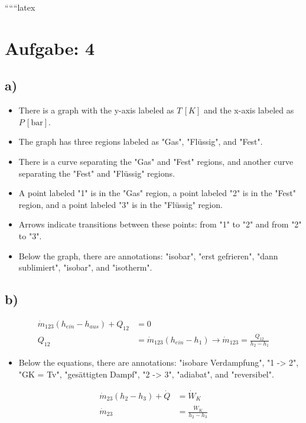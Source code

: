 
``````latex


\section*{Aufgabe: 4}

\subsection*{a)}

\begin{itemize}
    \item There is a graph with the y-axis labeled as \( T \, [K] \) and the x-axis labeled as \( P \, [\text{bar}] \).
    \item The graph has three regions labeled as "Gas", "Flüssig", and "Fest".
    \item There is a curve separating the "Gas" and "Fest" regions, and another curve separating the "Fest" and "Flüssig" regions.
    \item A point labeled "1" is in the "Gas" region, a point labeled "2" is in the "Fest" region, and a point labeled "3" is in the "Flüssig" region.
    \item Arrows indicate transitions between these points: from "1" to "2" and from "2" to "3".
    \item Below the graph, there are annotations: "isobar", "erst gefrieren", "dann sublimiert", "isobar", and "isotherm".
\end{itemize}

\subsection*{b)}

\begin{align*}
    \dot{m}_{123} (h_{ein} - h_{aus}) + Q_{12} &= 0 \\
    Q_{12} &= \dot{m}_{123} (h_{ein} - h_{1}) \rightarrow \dot{m}_{123} = \frac{Q_{12}}{h_{2} - h_{1}}
\end{align*}

\begin{itemize}
    \item Below the equations, there are annotations: "isobare Verdampfung", "1 -> 2", "GK = Tv", "gesättigten Dampf", "2 -> 3", "adiabat", and "reversibel".
\end{itemize}

\begin{align*}
    \dot{m}_{23} (h_{2} - h_{3}) + \dot{Q} &= \dot{W}_{K} \\
    \dot{m}_{23} &= \frac{\dot{W}_{K}}{h_{2} - h_{3}}
\end{align*}

